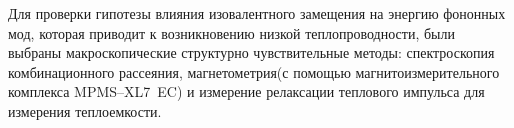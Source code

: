 Для проверки гипотезы влияния изовалентного замещения на энергию фононных мод, которая приводит к возникновению низкой теплопроводности, были выбраны макроскопические структурно чувствительные методы: спектроскопия комбинационного рассеяния, магнетометрия(с помощью магнитоизмерительного комплекса MPMS--XL7~EC) и измерение релаксации теплового импульса для измерения теплоемкости.


\newpage
